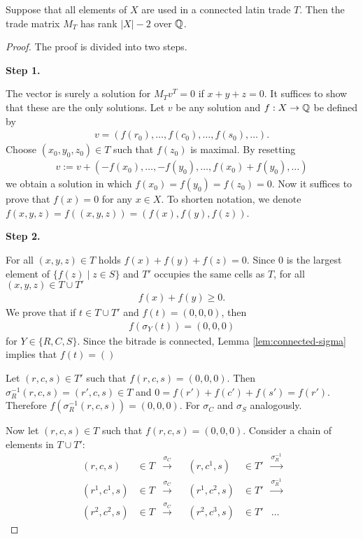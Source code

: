 \begin{lem}
Suppose that all elements of $X$ are used in a connected latin trade $T$. Then the trade matrix $M_T$ has rank $|X|-2$ over $\mathbb Q$.
\end{lem}
\begin{proof}
The proof is divided into two steps.

%
%
\item \textbf{Step 1.}

The vector
%
is surely a solution for $M_Tv^T = 0$ if $x+y+z=0$. It suffices to show that these are the only solutions. Let $v$ be any solution and $f:X \rightarrow \mathbb Q$ be defined by
\begin{align}
	v = (f(r_0), \dots, f(c_0), \dots, f(s_0), \dots).
\end{align}
Choose $(x_0, y_0, z_0) \in T$ such that $f(z_0)$ is maximal. By resetting
\begin{align}
	v := v+(-f(x_0), \dots, -f(y_0), \dots,f(x_0)+f(y_0), \dots)
\end{align}
we obtain a solution in which $f(x_0) = f(y_0) = f(z_0) = 0$. Now it suffices to prove that $f(x) = 0$ for any $x \in X$. To shorten notation, we denote $f(x,y,z) = f((x,y,z)) = (f(x),f(y),f(z))$.

%
%
\item \textbf{Step 2.}

For all $(x,y,z) \in T$ holds $f(x)+f(y)+f(z)=0$. Since $0$ is the largest element of $\{f(z) \mid z \in S\}$ and $T'$ occupies the same cells as $T$, for all $(x,y,z) \in T \cup T'$
\begin{align}
	f(x) + f(y) \geq 0.
\end{align}
We prove that if $t \in T\cup T'$ and $f(t) = (0,0,0)$, then
\begin{align}
	f(\sigma_Y(t)) = (0,0,0)
\end{align}
for $Y \in \{R, C, S\}$. Since the bitrade is connected, Lemma \ref{lem:connected-sigma} implies that $f(t) = ()$

Let $(r,c,s) \in T'$ such that $f(r,c,s) = (0,0,0)$. Then $\sigma_R^{-1}(r,c,s) = (r',c,s) \in T$ and $0=f(r')+f(c')+f(s')=f(r')$. Therefore $f(\sigma_R^{-1}(r,c,s)) = (0,0,0)$. For $\sigma_C$ and $\sigma_S$ analogously.

Now let $(r,c,s) \in T$ such that $f(r,c,s)=(0,0,0)$. Consider a chain of elements in $T \cup T'$:
\begin{align*}
	(r,c,s) &\in T &\xrightarrow{\sigma_C}& &(r,c^1,s) &\in T' & \xrightarrow{\sigma_R^{-1}} \\
	(r^1,c^1,s) &\in T &\xrightarrow{\sigma_C}& &(r^1,c^2,s) &\in T' & \xrightarrow{\sigma_R^{-1}} \\
	(r^2,c^2,s) &\in T &\xrightarrow{\sigma_C}& &(r^2,c^3,s) &\in T' & \dots
\end{align*}


\end{proof}
